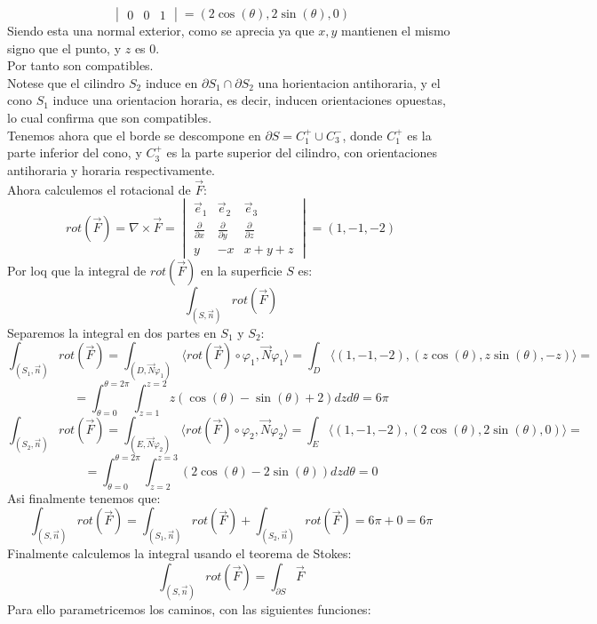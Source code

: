 {$$\begin{vmatrix}
        0 & 0 & 1
    \end{vmatrix} = \left( 2\cos(\theta), 2\sin(\theta), 0 \right)$$
    Siendo esta una normal exterior, como se aprecia ya que $x,y$ mantienen el mismo signo que el punto, y $z$ es $0$.\\
    Por tanto son compatibles.\\
    Notese que el cilindro $S_2$ induce en $\partial S_1 \cap \partial S_2$ una horientacion antihoraria, y el cono $S_1$ induce una orientacion horaria, es decir, inducen orientaciones opuestas, lo cual confirma que son compatibles.\\
    Tenemos ahora que el borde se descompone en $\partial S = C_1^+ \cup C_3^-$, donde $C_1^+$ es la parte inferior del cono, y $C_3^+$ es la parte superior del cilindro, con orientaciones antihoraria y horaria respectivamente.\\
    Ahora calculemos el rotacional de $\vec{F}$:
    $$ rot(\vec{F}) = \nabla \times \vec{F} = \begin{vmatrix}
        \vec{e}_1 & \vec{e}_2 & \vec{e}_3 \\
        \frac{\partial}{\partial x} & \frac{\partial}{\partial y} & \frac{\partial}{\partial z} \\
        y & -x & x + y + z
    \end{vmatrix} = \left( 1, -1, -2 \right)$$
    Por loq que la integral de $rot(\vec{F})$ en la superficie $S$ es:
    $$ \int_{(S, \vec{n})} rot(\vec{F})$$
    Separemos la integral en dos partes en $S_1$ y $S_2$:
    $$ \int_{(S_1, \vec{n})} rot(\vec{F}) = \int_{(D, \vec{N}{\varphi_1})} \langle rot(\vec{F}) \circ \varphi_1, \vec{N}{\varphi_1} \rangle = \int_{D} \langle (1,-1,-2), (z\cos(\theta), z\sin(\theta), -z) \rangle =$$
    $$ = \int_{\theta = 0}^{\theta = 2\pi} \int_{z=1}^{z=2} z(\cos(\theta) - \sin(\theta) + 2) dz d\theta = 6\pi$$
    $$ \int_{(S_2, \vec{n})} rot(\vec{F}) = \int_{(E, \vec{N}{\varphi_2})} \langle rot(\vec{F}) \circ \varphi_2, \vec{N}{\varphi_2} \rangle = \int_{E} \langle (1,-1,-2), (2\cos(\theta), 2\sin(\theta), 0) \rangle =$$
    $$ = \int_{\theta = 0}^{\theta = 2\pi} \int_{z=2}^{z=3} (2\cos(\theta) - 2\sin(\theta)) dz d\theta = 0$$
    Asi finalmente tenemos que:
    $$ \int_{(S, \vec{n})} rot(\vec{F}) = \int_{(S_1, \vec{n})} rot(\vec{F}) + \int_{(S_2, \vec{n})} rot(\vec{F}) = 6\pi + 0 = 6\pi$$
    Finalmente calculemos la integral usando el teorema de Stokes:
    $$ \int_{(S, \vec{n})} rot(\vec{F}) = \int_{\partial S} \vec{F} $$
    Para ello parametricemos los caminos, con las siguientes funciones:
}
